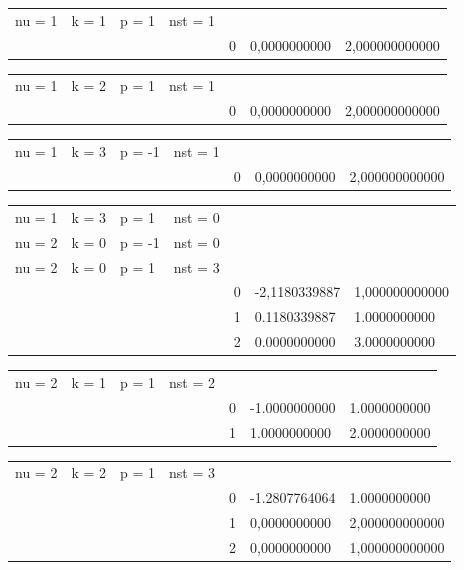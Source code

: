 \documentclass[11pt]{article}
\begin{document}
\begin{tabular}{lllllll}	
	nu = 1 & k = 1 & p = 1 & nst = 1 & & & \\
    & & & & 0 & 0,0000000000 & 2,000000000000 \\
\end{tabular}

\begin{tabular}{lllllll}
nu = 1 & k = 2 & p = 1 & nst = 1 & & & \\
    & & & & 0 & 0,0000000000 & 2,000000000000 \\
\end{tabular}

\begin{tabular}{lllllll}    
nu = 1 & k = 3 & p = -1 & nst = 1 & & & \\
    & & & & 0 & 0,0000000000 & 2,000000000000 \\
\end{tabular}

\begin{tabular}{lllllll}    
nu = 1 & k = 3 & p = 1 & nst = 0 & & & \\
nu = 2 & k = 0 & p = -1 & nst = 0 & & & \\
nu = 2 & k = 0 & p = 1 & nst = 3 & & & \\
    & & & & 0 & -2,1180339887 & 1,000000000000 \\
    & & & & 1 & 0.1180339887 & 1.0000000000 \\
    & & & & 2 & 0.0000000000 & 3.0000000000 \\
\end{tabular}

\begin{tabular}{lllllll}    
nu = 2 & k = 1 & p = 1 & nst = 2 & & & \\
    & & & & 0 & -1.0000000000 & 1.0000000000 \\
    & & & & 1 & 1.0000000000 & 2.0000000000 \\
\end{tabular}

\begin{tabular}{lllllll}    
nu = 2 & k = 2 & p = 1 & nst = 3 & & & \\
    & & & & 0 & -1.2807764064 & 1.0000000000\\
    & & & & 1 & 0,0000000000 & 2,000000000000\\
    & & & & 2 & 0,0000000000 & 1,000000000000 \\
\end{tabular}
\end{document}
